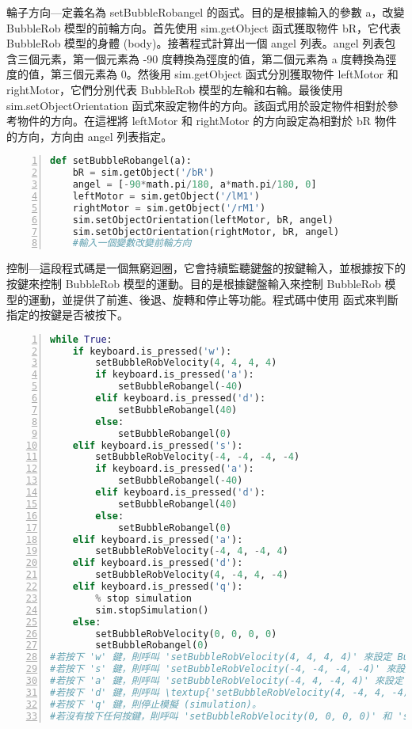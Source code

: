 輪子方向---定義名為 setBubbleRobangel 的函式。目的是根據輸入的參數 a，改變 BubbleRob 模型的前輪方向。首先使用 sim.getObject 函式獲取物件 bR，它代表 BubbleRob 模型的身體 (body)。接著程式計算出一個 angel 列表。angel 列表包含三個元素，第一個元素為 -90 度轉換為弳度的值，第二個元素為 a 度轉換為弳度的值，第三個元素為 0。然後用 sim.getObject 函式分別獲取物件 leftMotor 和 rightMotor，它們分別代表 BubbleRob 模型的左輪和右輪。最後使用 sim.setObjectOrientation 函式來設定物件的方向。該函式用於設定物件相對於參考物件的方向。在這裡將 leftMotor 和 rightMotor 的方向設定為相對於 bR 物件的方向，方向由 angel 列表指定。
\begin{lstlisting}[language=Python, frame=single, numbers=left, captionpos=b, basicstyle=\ttfamily\small,showstringspaces=false, breaklines=true, tabsize=4, xleftmargin=15pt]
def setBubbleRobangel(a):
    bR = sim.getObject('/bR')
    angel = [-90*math.pi/180, a*math.pi/180, 0]
    leftMotor = sim.getObject('/lM1')
    rightMotor = sim.getObject('/rM1')
    sim.setObjectOrientation(leftMotor, bR, angel)
    sim.setObjectOrientation(rightMotor, bR, angel)
    #輸入一個變數改變前輪方向
\end{lstlisting}

控制---這段程式碼是一個無窮迴圈，它會持續監聽鍵盤的按鍵輸入，並根據按下的按鍵來控制 BubbleRob 模型的運動。目的是根據鍵盤輸入來控制 BubbleRob 模型的運動，並提供了前進、後退、旋轉和停止等功能。程式碼中使用  函式來判斷指定的按鍵是否被按下。
\begin{lstlisting}[language=Python, frame=single, numbers=left, captionpos=b, basicstyle=\ttfamily\small,showstringspaces=false, breaklines=true, tabsize=4, xleftmargin=15pt]
while True:
    if keyboard.is_pressed('w'):
        setBubbleRobVelocity(4, 4, 4, 4)
        if keyboard.is_pressed('a'):
            setBubbleRobangel(-40)
        elif keyboard.is_pressed('d'):
            setBubbleRobangel(40)
        else:
            setBubbleRobangel(0)
    elif keyboard.is_pressed('s'):
        setBubbleRobVelocity(-4, -4, -4, -4)
        if keyboard.is_pressed('a'):
            setBubbleRobangel(-40)
        elif keyboard.is_pressed('d'):
            setBubbleRobangel(40)
        else:
            setBubbleRobangel(0)
    elif keyboard.is_pressed('a'):
        setBubbleRobVelocity(-4, 4, -4, 4)
    elif keyboard.is_pressed('d'):
        setBubbleRobVelocity(4, -4, 4, -4)
    elif keyboard.is_pressed('q'):
        % stop simulation
        sim.stopSimulation()
    else:
        setBubbleRobVelocity(0, 0, 0, 0)
        setBubbleRobangel(0)
#若按下 'w' 鍵，則呼叫 'setBubbleRobVelocity(4, 4, 4, 4)' 來設定 BubbleRob 模型的速度為正向，並根據 'a' 和 'd' 鍵的狀態設定前輪的方向。
#若按下 's' 鍵，則呼叫 'setBubbleRobVelocity(-4, -4, -4, -4)' 來設定 BubbleRob 模型的速度為負向，並根據 'a' 和 'd' 鍵的狀態設定前輪的方向。
#若按下 'a' 鍵，則呼叫 'setBubbleRobVelocity(-4, 4, -4, 4)' 來設定 BubbleRob 模型的速度使其向左旋轉。
#若按下 'd' 鍵，則呼叫 \textup{'setBubbleRobVelocity(4, -4, 4, -4)'} 來設定 BubbleRob 模型的速度使其向右旋轉。
#若按下 'q' 鍵，則停止模擬 (simulation)。
#若沒有按下任何按鍵，則呼叫 'setBubbleRobVelocity(0, 0, 0, 0)' 和 'setBubbleRobangel(0)'，將 BubbleRob 模型的速度和前輪方向設定為零，即停止移動。
\end{lstlisting}
\newpage
